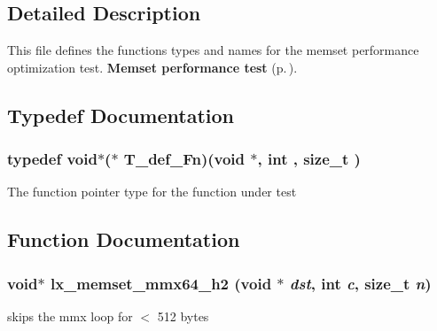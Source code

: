 \subsection{Detailed Description}
This file defines the functions types and names for the memset performance optimization test. {\bf Memset performance test} {\rm (p.\,\pageref{group__memset__test})}.





\subsection{Typedef Documentation}
\subsubsection{\setlength{\rightskip}{0pt plus 5cm}typedef void$\ast$($\ast$ T\_\-def\_\-Fn)(void $\ast$, int , size\_\-t )}\label{memset_2def__test_8h_a0}


The function pointer type for the function under test 

\subsection{Function Documentation}
\subsubsection{\setlength{\rightskip}{0pt plus 5cm}void$\ast$ lx\_\-memset\_\-mmx64\_\-h2 (void $\ast$ {\em dst}, int {\em c}, size\_\-t {\em n})}\label{memset_2def__test_8h_a13}


skips the mmx loop for $<$ 512 bytes 